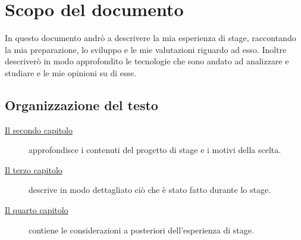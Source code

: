 \section{Scopo del documento}
In questo documento andrò a descrivere la mia esperienza di stage, raccontando la mia preparazione, lo sviluppo e le mie valutazioni
riguardo ad esso. Inoltre descriverò in modo approfondito le tecnologie che sono andato ad analizzare e studiare e le mie opinioni su di esse.


\subsection{Organizzazione del testo}

\begin{description}

    \item[{\hyperref[cap:analisi-requisiti]{Il secondo capitolo}}] approfondisce i contenuti del progetto di stage e i motivi della scelta.

    \item[{\hyperref[cap:progettazione-realizzazione]{Il terzo capitolo}}] descrive in modo dettagliato ciò che è stato fatto durante lo stage.

    \item[{\hyperref[cap:valutazione-retrospettiva]{Il quarto capitolo}}] contiene le considerazioni a posteriori dell'esperienza di stage.

\end{description}


